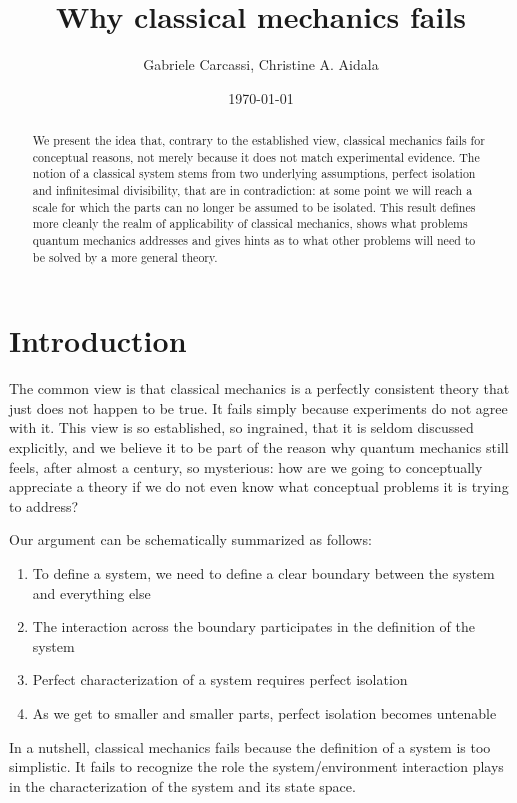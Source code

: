 \documentclass[10pt,twocolumn, nofootinbib]{revtex4-2}
\begin{document}
\title{Why classical mechanics fails}
\author{Gabriele Carcassi, Christine A. Aidala}

\date{\today}


\begin{abstract}
We present the idea that, contrary to the established view, classical mechanics fails for conceptual reasons, not merely because it does not match experimental evidence. The notion of a classical system stems from two underlying assumptions, perfect isolation and infinitesimal divisibility, that are in contradiction: at some point we will reach a scale for which the parts can no longer be assumed to be isolated. This result defines more cleanly the realm of applicability of classical mechanics, shows what problems quantum mechanics addresses and gives hints as to what other problems will need to be solved by a more general theory.
\end{abstract}

\maketitle

\section{Introduction}

The common view is that classical mechanics is a perfectly consistent theory that just does not happen to be true. It fails simply because experiments do not agree with it. This view is so established, so ingrained, that it is seldom discussed explicitly, and we believe it to be part of the reason why quantum mechanics still feels, after almost a century, so mysterious: how are we going to conceptually appreciate a theory if we do not even know what conceptual problems it is trying to address?

Our argument can be schematically summarized as follows:
\begin{enumerate}
	\item To define a system, we need to define a clear boundary between the system and everything else
	\item The interaction across the boundary participates in the definition of the system
	\item Perfect characterization of a system requires perfect isolation
	\item As we get to smaller and smaller parts, perfect isolation becomes untenable
\end{enumerate}
In a nutshell, classical mechanics fails because the definition of a system is too simplistic. It fails to recognize the role the system/environment interaction plays in the characterization of the system and its state space.
\end{document}
